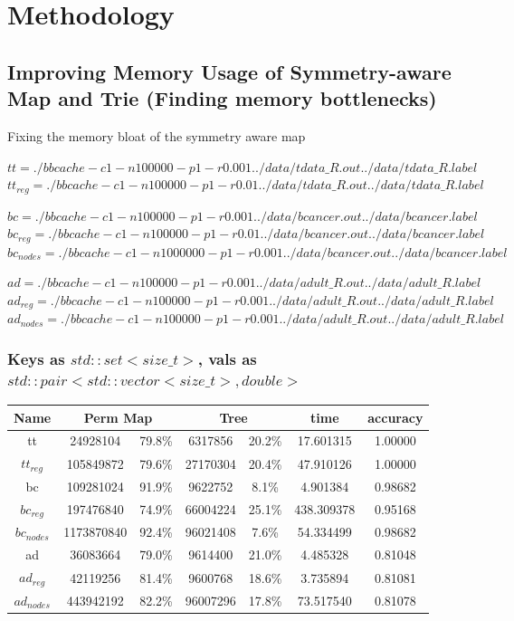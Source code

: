 \documentclass[]{article}
\theoremstyle{definition}
\begin{document}
\section{Methodology}

\subsection{Improving Memory Usage of Symmetry-aware Map and Trie (Finding memory bottlenecks)}

Fixing the memory bloat of the symmetry aware map

$tt = ./bbcache -c 1 -n 100000 -p 1 -r 0.001 ../data/tdata\_R.out ../data/tdata\_R.label$
$tt_{reg} = ./bbcache -c 1 -n 100000 -p 1 -r 0.01 ../data/tdata\_R.out ../data/tdata\_R.label$

$bc = ./bbcache -c 1 -n 100000 -p 1 -r 0.001 ../data/bcancer.out ../data/bcancer.label$
$bc_{reg} = ./bbcache -c 1 -n 100000 -p 1 -r 0.01 ../data/bcancer.out ../data/bcancer.label$
$bc_{nodes} = ./bbcache -c 1 -n 1000000 -p 1 -r 0.001 ../data/bcancer.out ../data/bcancer.label$

$ad = ./bbcache -c 1 -n 100000 -p 1 -r 0.001 ../data/adult\_R.out ../data/adult\_R.label$
$ad_{reg} = ./bbcache -c 1 -n 100000 -p 1 -r 0.001 ../data/adult\_R.out ../data/adult\_R.label$
$ad_{nodes} = ./bbcache -c 1 -n 100000 -p 1 -r 0.001 ../data/adult\_R.out ../data/adult\_R.label$

\subsubsection{Keys as $std::set<size\_t>$, vals as $std::pair<std::vector<size\_t>, double>$}

\begin{center}
\begin{tabular} { |c|c|c|c|c|c|c| }
\hline
Name & \multicolumn{2}{c|}{Perm Map} & \multicolumn{2}{c|}{Tree} & time & accuracy \\
\hline
tt & 24928104 & 79.8\%  & 6317856 & 20.2\% & 17.601315 & 1.00000 \\

$tt_{reg}$ & 105849872 & 79.6\% & 27170304 & 20.4\% & 47.910126 & 1.00000 \\

bc &109281024 & 91.9\% & 9622752 & 8.1\% & 4.901384 & 0.98682 \\

$bc_{reg}$ & 197476840 & 74.9\% & 66004224 & 25.1\% & 438.309378 & 0.95168 \\

$bc_{nodes}$ & 1173870840 & 92.4\% & 96021408 & 7.6\% & 54.334499 & 0.98682 \\

ad & 36083664 & 79.0\% & 9614400 & 21.0\% & 4.485328 & 0.81048 \\

$ad_{reg}$ & 42119256 & 81.4\% & 9600768 & 18.6\% & 3.735894 & 0.81081 \\

$ad_{nodes}$ & 443942192 & 82.2\% & 96007296 & 17.8\% & 73.517540 & 0.81078 \\
\hline
\end{tabular}
\end{center}
\end{document}
